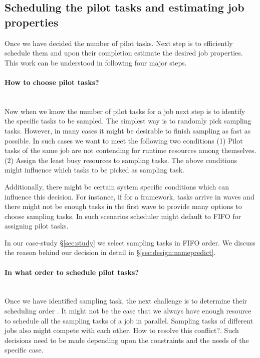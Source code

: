 \subsection{Scheduling the pilot tasks and estimating job properties}
Once we have decided the number of pilot tasks. Next step is to
efficiently schedule them and upon their completion estimate the desired
job properties.
This work can be understood in following four major steps. 

\paragraph{How to choose pilot tasks?} \\ 
Now when we know the number of pilot tasks for a job next step is to identify
the specific tasks to be sampled. The simplest way is to randomly pick sampling
tasks.  However, in many cases it might be desirable to finish sampling as fast
as possible. In such cases we want to meet the following two conditions (1)
Pilot tasks of the same job are not contending for runtime resources among
themselves. (2) Assign the least busy resources to sampling tasks. 
The above conditions might influence which tasks to be
picked as sampling task. 

Additionally, there might be certain system specific conditions which can
influence this decision. For instance, if for a framework, tasks arrive in
waves and there might not be enough tasks in the first wave to provide many
options to choose sampling tasks. In such scenarios scheduler might default to
FIFO for assigning pilot tasks.

In our case-study \S\ref{sec:study} we select sampling tasks in FIFO order.  We
discuss the reason behind our decision in detail in
\S\ref{sec:design:namepredict}.

\paragraph{In what order to schedule pilot tasks?} \\
Once we have identified sampling task, the next challenge is to determine their
scheduling order . It might not be the case that we always have enough resource
to schedule all the sampling tasks of a job in parallel. Sampling tasks of
different jobs also might compete with each other. How to resolve this
conflict?. Such decisions need to be made depending upon the constraints and
the needs of the specific case.

